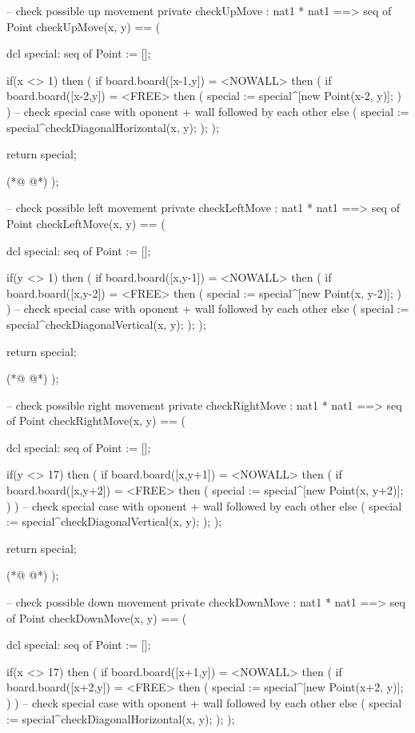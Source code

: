\begin{vdmpp}[breaklines=true]
  -- check possible up movement
  private checkUpMove : nat1 * nat1 ==> seq of Point
  checkUpMove(x, y) ==
  (
  
   dcl special: seq of Point := [];
   
   if(x <> 1)
   then
   (
    if board.board([x-1,y]) = <NOWALL>
    then
    (
     if board.board([x-2,y]) = <FREE>
     then
     (
      special := special^[new Point(x-2, y)];
     )
    )
    -- check special case with oponent + wall followed by each other
    else
    (
     special := special^checkDiagonalHorizontal(x, y);
    );
   );
   
   return special;
    
(*@
\label{checkLeftMove:286}
@*)
  );
  
  -- check possible left movement
  private checkLeftMove : nat1 * nat1 ==> seq of Point
  checkLeftMove(x, y) ==
  (
   
   dcl special: seq of Point := [];
   
   if(y <> 1)
   then
   (
    if board.board([x,y-1]) = <NOWALL>
    then
    (
     if board.board([x,y-2]) = <FREE>
     then
     (
      special := special^[new Point(x, y-2)];
     )
    )
    -- check special case with oponent + wall followed by each other
    else
    (
     special := special^checkDiagonalVertical(x, y);
    );
   );
   
   return special;
   
(*@
\label{checkRightMove:316}
@*)
  );
  
  -- check possible right movement
  private checkRightMove : nat1 * nat1 ==> seq of Point
  checkRightMove(x, y) ==
  ( 
  
   dcl special: seq of Point := [];
   
   if(y <> 17)
   then
   (
    if board.board([x,y+1]) = <NOWALL>
    then
    (
     if board.board([x,y+2]) = <FREE>
     then
     (
      special := special^[new Point(x, y+2)];
     )
    )
    -- check special case with oponent + wall followed by each other
    else
    (
     special := special^checkDiagonalVertical(x, y);
    );
   );
   
   return special;
   
(*@
\label{checkDownMove:346}
@*)
  );
  
  -- check possible down movement
  private checkDownMove : nat1 * nat1 ==> seq of Point
  checkDownMove(x, y) ==
  (
  
   dcl special: seq of Point := [];
  
   if(x <> 17)
   then
   (
    if board.board([x+1,y]) = <NOWALL>
    then
    (
     if board.board([x+2,y]) = <FREE>
     then
     (
      special := special^[new Point(x+2, y)];
     )
    )
    -- check special case with oponent + wall followed by each other
    else
    (
     special := special^checkDiagonalHorizontal(x, y);
    );
   );
   

\end{vdmpp}
